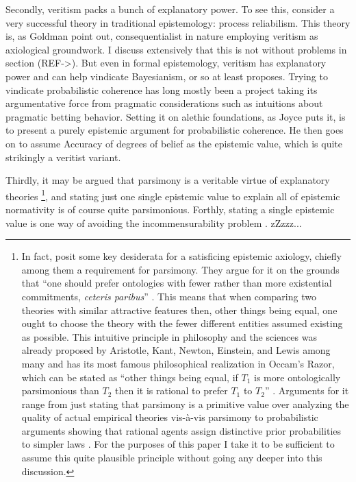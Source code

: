 \documentclass[12pt,numbers=noenddot]{scrartcl}
\begin{document}
Secondly, veritism packs a bunch of explanatory power. To see this, consider a very successful theory in traditional epistemology: process reliabilism. This theory is, as Goldman point out, consequentialist in nature \autocite{Goldman2002-GOLTUO-2} employing veritism as axiological groundwork. I discuss extensively that this is not without problems in section (REF->). But even in formal epistemology, veritism has explanatory power and can help vindicate Bayesianism, or so at least \textcite{Joyce2009-JOYAAC} proposes. Trying to vindicate probabilistic coherence has long mostly been a project taking its argumentative force from pragmatic considerations such as intuitions about pragmatic betting behavior. Setting it on alethic foundations, as Joyce puts it, is to present a purely epistemic argument for probabilistic coherence. He then goes on to assume Accuracy of degrees of belief as the epistemic value, which is quite strikingly a veritist variant.

Thirdly, it may be argued that parsimony is a veritable virtue of explanatory theories \footnote{In fact, \textcite[342]{Ahlstrom-Vij2013} posit some key desiderata for a satisficing epistemic axiology, chiefly among them a requirement for parsimony. They argue for it on the grounds that “one should prefer ontologies with fewer rather than more existential commitments, \emph{ceteris paribus}” \autocite{Ahlstrom-Vij2013}. This means that when comparing two theories with similar attractive features then, other things being equal, one ought to choose the theory with the fewer different entities assumed existing as possible. This intuitive principle in philosophy and the sciences was already proposed by Aristotle, Kant, Newton, Einstein, and Lewis among many \autocite[3]{sep-simplicity} and has its most famous philosophical realization in Occam's Razor, which can be stated as “other things being equal, if $T_1$ is more ontologically parsimonious than $T_2$ then it is rational to prefer $T_1$ to $T_2$” \autocite[7]{sep-simplicity}. Arguments for it range from just stating that parsimony is a primitive value over analyzing the quality of actual empirical theories vis-à-vis parsimony to probabilistic arguments showing that rational agents assign distinctive prior probabilities to simpler laws \autocite[11-26]{sep-simplicity}. For the purposes of this paper I take it to be sufficient to assume this quite plausible principle without going any deeper into this discussion.},
and stating just one single epistemic value to explain all of epistemic normativity is of course quite parsimonious.
Forthly, stating a single epistemic value is one way of avoiding the incommensurability problem \autocite{sep-value-theory}. zZzzz...
\end{document}
